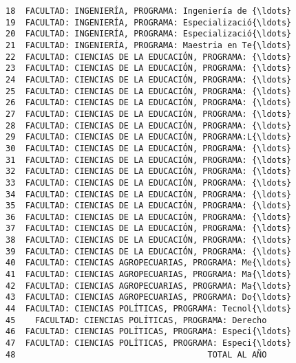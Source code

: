 \documentclass[11pt]{article}
\begin{document}
\begin{Verbatim}[commandchars=\\\{\}]
18  FACULTAD: INGENIERÍA, PROGRAMA: Ingeniería de {\ldots}                                   
19  FACULTAD: INGENIERÍA, PROGRAMA: Especializació{\ldots}                                   
20  FACULTAD: INGENIERÍA, PROGRAMA: Especializació{\ldots}                                   
21  FACULTAD: INGENIERÍA, PROGRAMA: Maestria en Te{\ldots}                                   
22  FACULTAD: CIENCIAS DE LA EDUCACIÓN, PROGRAMA: {\ldots}                                   
23  FACULTAD: CIENCIAS DE LA EDUCACIÓN, PROGRAMA: {\ldots}                                   
24  FACULTAD: CIENCIAS DE LA EDUCACIÓN, PROGRAMA: {\ldots}                                   
25  FACULTAD: CIENCIAS DE LA EDUCACIÓN, PROGRAMA: {\ldots}                                   
26  FACULTAD: CIENCIAS DE LA EDUCACIÓN, PROGRAMA: {\ldots}                                   
27  FACULTAD: CIENCIAS DE LA EDUCACIÓN, PROGRAMA: {\ldots}                                   
28  FACULTAD: CIENCIAS DE LA EDUCACIÓN, PROGRAMA: {\ldots}                                   
29  FACULTAD: CIENCIAS DE LA EDUCACIÓN, PROGRAMA:L{\ldots}                                   
30  FACULTAD: CIENCIAS DE LA EDUCACIÓN, PROGRAMA: {\ldots}                                   
31  FACULTAD: CIENCIAS DE LA EDUCACIÓN, PROGRAMA: {\ldots}                                   
32  FACULTAD: CIENCIAS DE LA EDUCACIÓN, PROGRAMA: {\ldots}                                   
33  FACULTAD: CIENCIAS DE LA EDUCACIÓN, PROGRAMA: {\ldots}                                   
34  FACULTAD: CIENCIAS DE LA EDUCACIÓN, PROGRAMA: {\ldots}                                   
35  FACULTAD: CIENCIAS DE LA EDUCACIÓN, PROGRAMA: {\ldots}                                   
36  FACULTAD: CIENCIAS DE LA EDUCACIÓN, PROGRAMA: {\ldots}                                   
37  FACULTAD: CIENCIAS DE LA EDUCACIÓN, PROGRAMA: {\ldots}                                   
38  FACULTAD: CIENCIAS DE LA EDUCACIÓN, PROGRAMA: {\ldots}                                   
39  FACULTAD: CIENCIAS DE LA EDUCACIÓN, PROGRAMA: {\ldots}                                   
40  FACULTAD: CIENCIAS AGROPECUARIAS, PROGRAMA: Me{\ldots}                                   
41  FACULTAD: CIENCIAS AGROPECUARIAS, PROGRAMA: Ma{\ldots}                                   
42  FACULTAD: CIENCIAS AGROPECUARIAS, PROGRAMA: Ma{\ldots}                                   
43  FACULTAD: CIENCIAS AGROPECUARIAS, PROGRAMA: Do{\ldots}                                   
44  FACULTAD: CIENCIAS POLÍTICAS, PROGRAMA: Tecnol{\ldots}                                   
45    FACULTAD: CIENCIAS POLÍTICAS, PROGRAMA: Derecho                                   
46  FACULTAD: CIENCIAS POLÍTICAS, PROGRAMA: Especi{\ldots}                                   
47  FACULTAD: CIENCIAS POLÍTICAS, PROGRAMA: Especi{\ldots}                                   
48                                       TOTAL AL AÑO                                   


\end{Verbatim}
\end{document}
